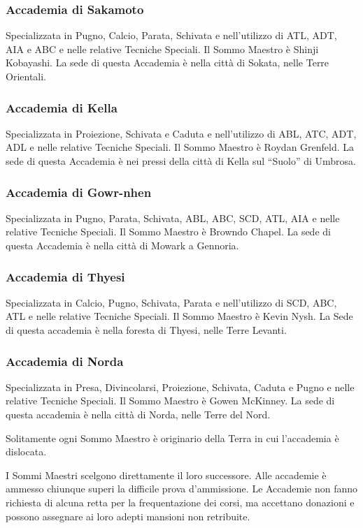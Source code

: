 \subsubsection{Accademia di Sakamoto}  
Specializzata in Pugno, Calcio, Parata, Schivata e nell'utilizzo di
ATL, ADT, AIA e ABC e nelle relative Tecniche Speciali.  Il Sommo
Maestro \`e Shinji Kobayashi.  La sede di questa Accademia \`e
nella citt\`a di Sokata, nelle Terre Orientali.

\subsubsection{Accademia di Kella}
Specializzata in Proiezione, Schivata e Caduta e nell'utilizzo di ABL,
ATC, ADT, ADL e nelle relative Tecniche Speciali.  Il Sommo Maestro
\`e Roydan Grenfeld.  La sede di questa Accademia \`e nei pressi
della citt\`a di Kella sul ``Suolo'' di Umbrosa.

\subsubsection{Accademia di Gowr-nhen}  
Specializzata in Pugno, Parata, Schivata, ABL, ABC, SCD, ATL, AIA e
nelle relative Tecniche Speciali.  Il Sommo Maestro \`e Browndo
Chapel.  La sede di questa Accademia \`e nella citt\`a di Mowark a
Gennoria.

\subsubsection{Accademia di Thyesi} Specializzata in Calcio, Pugno,
Schivata, Parata e nell'utilizzo di SCD, ABC, ATL e nelle relative
Tecniche Speciali.  Il Sommo Maestro \`e Kevin Nysh.  La Sede di
questa accademia \`e nella foresta di Thyesi, nelle Terre Levanti.

\subsubsection{Accademia di Norda}  
Specializzata in Presa, Divincolarsi, Proiezione, Schivata, Caduta e
Pugno e nelle relative Tecniche Speciali.  Il Sommo Maestro \`e
Gowen McKinney.  La sede di questa accademia \`e nella citt\`a di
Norda, nelle Terre del Nord.

Solitamente ogni Sommo Maestro \`e originario della Terra in cui
l'accademia \`e dislocata.

I Sommi Maestri scelgono direttamente il loro successore.  Alle
accademie \`e ammesso chiunque superi la difficile prova d'ammissione.
Le Accademie non fanno richiesta di alcuna retta per la frequentazione
dei corsi, ma accettano donazioni e possono assegnare ai loro adepti
mansioni non retribuite.

